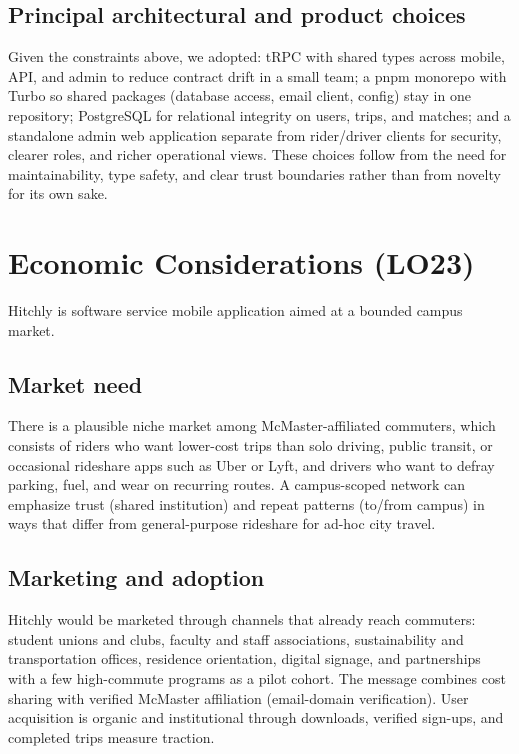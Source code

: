 \documentclass{article}
\begin{document}
\subsection{Principal architectural and product choices}

\noindent Given the constraints above, we adopted: tRPC with shared types across mobile, API, and admin to reduce contract drift in a small team; a pnpm monorepo with Turbo so shared packages (database access, email client, config) stay in one repository; PostgreSQL for relational integrity on users, trips, and matches; and a standalone admin web application separate from rider/driver clients for security, clearer roles, and richer operational views. These choices follow from the need for maintainability, type safety, and clear trust boundaries rather than from novelty for its own sake.

\section{Economic Considerations (LO23)}
\label{sec:lo23_economic}

\noindent Hitchly is software service mobile application aimed at a bounded campus market.
\subsection{Market need}

\noindent There is a plausible niche market among McMaster-affiliated commuters, which consists of riders who want lower-cost trips than solo driving, public transit, or occasional rideshare apps such as Uber or Lyft, and drivers who want to defray parking, fuel, and wear on recurring routes. A campus-scoped network can emphasize trust (shared institution) and repeat patterns (to/from campus) in ways that differ from general-purpose rideshare for ad-hoc city travel.

\subsection{Marketing and adoption}

\noindent Hitchly would be marketed through channels that already reach commuters: student unions and clubs, faculty and staff associations, sustainability and transportation offices, residence orientation, digital signage, and partnerships with a few high-commute programs as a pilot cohort. The message combines cost sharing with verified McMaster affiliation (email-domain verification). User acquisition is organic and institutional through downloads, verified sign-ups, and completed trips measure traction.
\end{document}
